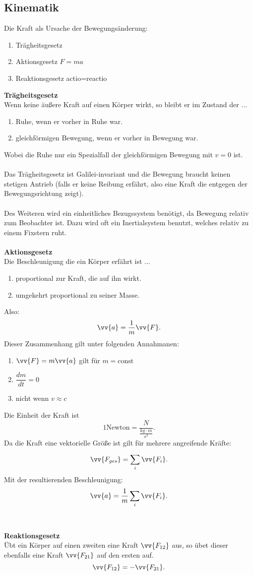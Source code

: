 \documentclass[a4paper,12pt]{article}
\begin{document}
\subsection{Kinematik}
Die Kraft als Ursache der Bewegungsänderung:
\begin{enumerate}[label=\arabic*.]
        \item Trägheitsgesetz
        \item Aktionsgesetz $F=ma$ 
        \item Reaktionsgesetz actio=reactio
\end{enumerate}
\textbf{Trägheitsgesetz}\\ 
Wenn keine äußere Kraft auf einen Körper wirkt, so bleibt er im Zustand der ...
\begin{enumerate}[label=...]
        \item Ruhe, wenn er vorher in Ruhe war.
        \item gleichförmigen Bewegung, wenn er vorher in Bewegung war.
\end{enumerate}
Wobei die Ruhe nur ein Spezialfall der gleichförmigen Bewegung mit $v=0$ ist.\\\\
Das Trägheitsgesetz ist Galilei-invariant und die Bewegung braucht keinen stetigen Antrieb (falls er keine Reibung erfährt, also eine Kraft die entgegen der Bewegungsrichtung zeigt).\\\\
Des Weiteren wird ein einheitliches Bezugssystem benötigt, da Bewegung relativ zum Beobachter ist. Dazu wird oft ein Inertialsystem benutzt, welches relativ zu einem Fixstern ruht.
\\\hfill\\\textbf{Aktionsgesetz}\\ 
Die Beschleunigung die ein Körper erfährt ist ...
\begin{enumerate}[label=...]
        \item proportional zur Kraft, die auf ihn wirkt.
        \item umgekehrt proportional zu seiner Masse.
\end{enumerate}
Also: \[
        \vv{a}=\dfrac{1}{m}\vv{F}
.\]
Dieser Zusammenhang gilt unter folgenden Annahmanen:
\begin{enumerate}[label=]
        \item $\vv{F}=m\vv{a}$ gilt für $m=\text{const}$ 
        \item $\dfrac{dm}{dt}=0$ 
        \item nicht wenn $v\approx c$ 
\end{enumerate}
Die Einheit der Kraft ist 
\[
        1\text{Newton}=\dfrac{N}{\tfrac{kg\cdot m}{s ^2}}
.\]
Da die Kraft eine vektorielle Größe ist gilt für mehrere angreifende Kräfte:
\[ 
\vv{F_{ges}}=\sum_{i}^{}\vv{F_i}
.\] 
Mit der resultierenden Beschleunigung:
\[ 
\vv{a}=\dfrac{1}{m}\sum_{i}^{}\vv{F_i}
.\] 
\\\hfill\\\textbf{Reaktionsgesetz}\\ 
Übt ein Körper auf einen zweiten eine Kraft $\vv{F_{12}}$ aus, so übet dieser ebenfalls eine Kraft $\vv{F_{21}}$ auf den ersten auf.
\[ 
        \vv{F_{12}}=-\vv{F_{21}}
.\] 
\end{document}
